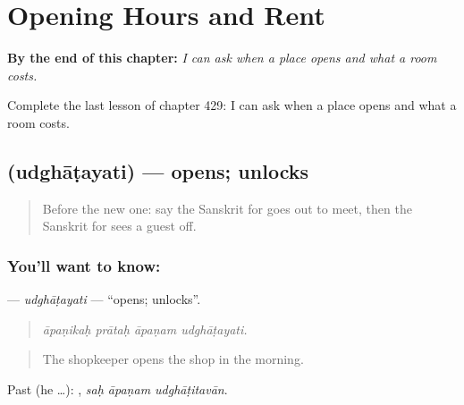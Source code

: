 
\chapter{Opening Hours and Rent}
\label{ch:sa-opening-hours-and-rent}

\begin{chapteropening}
\textbf{By the end of this chapter:} \emph{I can ask when a place opens and what a room costs.}

Complete the last lesson of chapter 429: I can ask when a place opens and what a room costs.
\end{chapteropening}

\section[\texorpdfstring{\sk{उद्घाटयति} (udghāṭayati)}{उद्घाटयति (udghāṭayati)}]{ (udghāṭayati) — opens; unlocks}

\label{lesson:SA-C429-udghatayati}



\begin{quote}
Before the new one: say the Sanskrit for goes out to meet, then the Sanskrit for sees a guest off.
\end{quote}

\subsection*{You'll want to know: }
\textbf{} — \emph{udghāṭayati} — \textquotedblleft{}opens; unlocks\textquotedblright{}.

\begin{quote}
   
\end{quote}

\begin{quote}
\emph{āpaṇikaḥ prātaḥ āpaṇam udghāṭayati.}
\end{quote}

\begin{quote}
The shopkeeper opens the shop in the morning.
\end{quote}

Past (he …):   , \emph{saḥ āpaṇam udghāṭitavān}.

